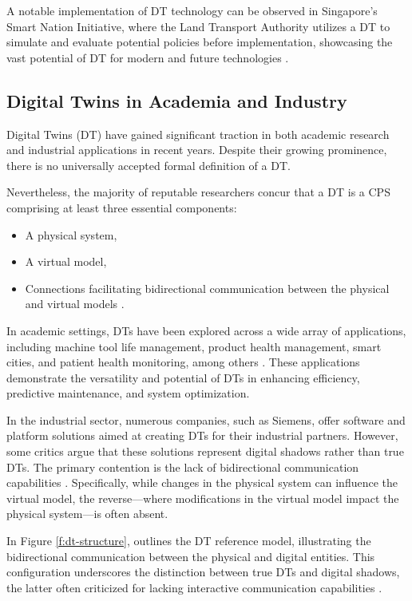 A notable implementation of \ac{DT} technology can be observed in Singapore's Smart Nation Initiative, where the Land Transport Authority 
utilizes a \ac{DT} to simulate and evaluate potential policies before implementation, showcasing the vast potential of \ac{DT} for modern and 
future technologies \cite{isprs-archives-XLII-4-W7-37-2017}.

\subsection{Digital Twins in Academia and Industry}

Digital Twins (DT) have gained significant traction in both academic research and industrial applications in recent years. Despite their growing prominence,
there is no universally accepted formal definition of a DT. 

Nevertheless, the majority of reputable researchers concur that a DT is a \ac{CPS} comprising at
least three essential components: 
\begin{itemize}
    \item A physical system,
    \item A virtual model,
    \item Connections facilitating bidirectional communication between the physical and virtual models \cite{TaoFei, 8477101, ROSEN2015567}.
\end{itemize}

In academic settings, DTs have been explored across a wide array of applications, including machine tool life management, product health management,
smart cities, and patient health monitoring, among others \cite{8361285, TAO2018169, isprs-archives-XLII-4-W7-37-2017, 10.1007/978-3-030-23162-0_19, 6296978}. 
These applications demonstrate the versatility and potential of DTs in enhancing efficiency, predictive maintenance, and system optimization.

In the industrial sector, numerous companies, such as Siemens, offer software and platform solutions aimed at creating DTs for their industrial partners. 
However, some critics argue that these solutions represent digital shadows rather than true DTs. The primary contention is the lack of bidirectional 
communication capabilities \cite{CIMINO2019103130}. Specifically, while changes in the physical system can influence the virtual model, the reverse—where 
modifications in the virtual model impact the physical system—is often absent. 

In Figure \ref{f:dt-structure}, \cite{dt_model} outlines the \ac{DT} reference model, illustrating the bidirectional communication between the physical 
and digital entities. This configuration underscores the distinction between true DTs and digital shadows, the latter often criticized for lacking 
interactive communication capabilities \cite{CIMINO2019103130}.


